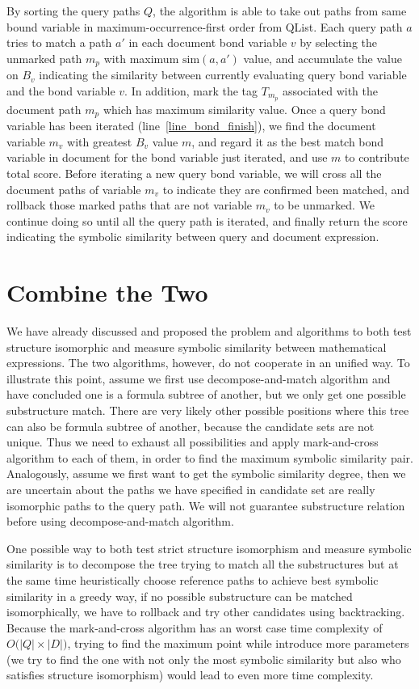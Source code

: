 By sorting the query paths $Q$, the algorithm is able to take out paths from same bound variable in maximum-occurrence-first order from QList. 
Each query path $a$ tries to match a path $a'$ in each document bond variable $v$ by selecting the unmarked path $m_p$ with maximum $\mathrm{sim}(a,a')$ value, and accumulate the value on $B_v$ indicating the similarity between currently evaluating query bond variable and the bond variable $v$.
In addition, mark the tag $T_{m_p}$ associated with the document path $m_p$ which has maximum similarity value.
Once a query bond variable has been iterated (line~\ref{line_bond_finish}),
we find the document variable $m_v$ with greatest $B_v$ value $m$, and regard it as the best match bond variable in document for the bond variable just iterated, and use $m$ to contribute total score.
Before iterating a new query bond variable, we will cross all the document paths of variable $m_v$ to indicate they are confirmed been matched, 
and rollback those marked paths that are not variable $m_v$ to be unmarked.
We continue doing so until all the query path is iterated, and finally return the score indicating the symbolic similarity between query and document expression.

\section{Combine the Two}
We have already discussed and proposed the problem and algorithms to both test structure isomorphic and measure symbolic similarity between mathematical expressions. The two algorithms, however, do not cooperate in an unified way. 
To illustrate this point, assume we first use decompose-and-match algorithm and have concluded one is a formula subtree of another, but we only get one possible substructure match. 
There are very likely other possible positions where this tree can also be formula subtree of another, because the candidate sets are not unique. 
Thus we need to exhaust all possibilities and apply mark-and-cross algorithm to each of them, in order to find the maximum symbolic similarity pair. 
Analogously, assume we first want to get the symbolic similarity degree, then we are uncertain about the paths we have specified in candidate set are really isomorphic paths to the query path. 
We will not guarantee substructure relation before using decompose-and-match algorithm.

One possible way to both test strict structure isomorphism and measure symbolic similarity is to decompose the tree trying to match all the substructures but at the same time heuristically choose reference paths to achieve best symbolic similarity in a greedy way, if no possible substructure can be matched isomorphically, we have to rollback and try other candidates using backtracking.
Because the mark-and-cross algorithm has an worst case time complexity of $O\big(|Q| \times |D|\big)$,
trying to find the maximum point while introduce more parameters (we try to find the one with not only the most symbolic similarity but also who satisfies structure isomorphism) would lead to even more time complexity. 

